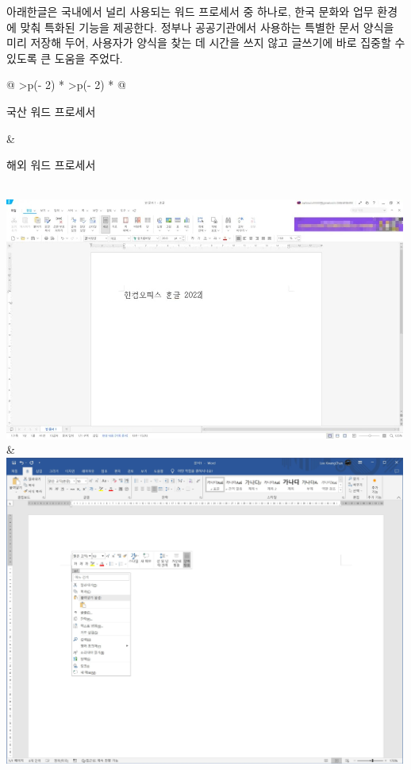 \documentclass[
  letterpaper,
]{book}
\begin{document}
아래한글은 국내에서 널리 사용되는 워드 프로세서 중 하나로, 한국 문화와
업무 환경에 맞춰 특화된 기능을 제공한다. 정부나 공공기관에서 사용하는
특별한 문서 양식을 미리 저장해 두어, 사용자가 양식을 찾는 데 시간을 쓰지
않고 글쓰기에 바로 집중할 수 있도록 큰 도움을 주었다.

\begin{longtable}[]{@{}
  >{\centering\arraybackslash}p{(\columnwidth - 2\tabcolsep) * }
  >{\centering\arraybackslash}p{(\columnwidth - 2\tabcolsep) * }@{}}
\toprule\noalign{}
\begin{minipage}[b]{\linewidth}\centering
국산 워드 프로세서
\end{minipage} & \begin{minipage}[b]{\linewidth}\centering
해외 워드 프로세서
\end{minipage} \\
\midrule\noalign{}
\endhead
\bottomrule\noalign{}
\endlastfoot
\includegraphics[width=5.20833in,height=\textheight]{images/hangul_word.jpg}
&
\includegraphics[width=5.20833in,height=\textheight]{images/word_ms.jpg} \\
\end{longtable}
\end{document}
